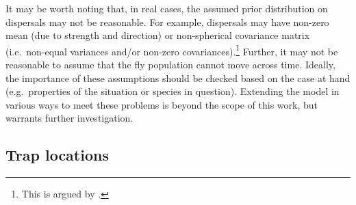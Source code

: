 \documentclass[
]{book}
\begin{document}
It may be worth noting that, in real cases, the assumed prior distribution on dispersals may not be reasonable. For example, dispersals may have non-zero mean (due to strength and direction) or non-spherical covariance matrix (i.e.~non-equal variances and/or non-zero covariances).\footnote{This is argued by \citet{baker1986}.} Further, it may not be reasonable to assume that the fly population cannot move across time. Ideally, the importance of these assumptions should be checked based on the case at hand (e.g.~properties of the situation or species in question). Extending the model in various ways to meet these problems is beyond the scope of this work, but warrants further investigation.

\hypertarget{trap-locations}{%
\subsection{Trap locations}\label{trap-locations}}
\end{document}
